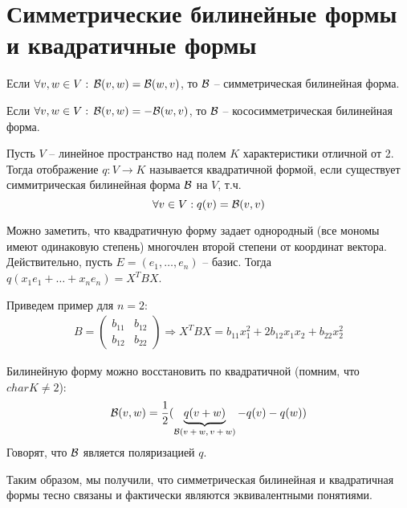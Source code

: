 \section{Симметрические билинейные формы и квадратичные формы}
\begin{conj}
    Если $\forall v, w \in V: \, \mathcal{B}(v, w) = \mathcal{B}(w, v)$, то 
    $\mathcal{B}$ -- симметрическая билинейная форма.
\end{conj}

\begin{conj}
    Если $\forall v, w \in V: \, \mathcal{B}(v, w) = -\mathcal{B}(w, v)$, то 
    $\mathcal{B}$ -- кососимметрическая билинейная форма.
\end{conj}

\begin{conj}
    Пусть $V$ -- линейное пространство над полем $K$ характеристики отличной от 2.
    Тогда отображение $q: V \to K$ называется квадратичной формой,
    если существует симмитрическая билинейная форма $\mathcal{B}$ на $V$, т.ч.
    \[ \forall v \in V: q(v) = \mathcal{B}(v, v) \]
\end{conj}

Можно заметить, что квадратичную форму задает однородный (все мономы имеют одинаковую степень) многочлен второй степени от координат вектора.
Действительно, пусть $E = (e_1, \dots, e_n)$ -- базис.
Тогда $q(x_1e_1 + \dots + x_ne_n) = X^TBX$.

Приведем пример для $n = 2$: \begin{gather*}
    B = \left(\begin{array}{cc}
        b_{11} & b_{12} \\ 
        b_{12} & b_{22}
        \end{array}\right) \Rightarrow X^TBX = b_{11}x^2_1 + 2b_{12}x_1x_2 + b_{22}x^2_2
\end{gather*}

Билинейную форму можно восстановить по квадратичной (помним, что $char K \neq 2$):
$$
    \mathcal{B}(v, w) = \frac{1}{2}(
        \underbrace{q(v + w)}_{\text{$\mathcal{B}(v + w, v + w)$}} - q(v) - q(w)
        )
$$
Говорят, что $\mathcal{B}$ является поляризацией $q$.

Таким образом, мы получили, что симметрическая билинейная и квадратичная формы тесно связаны и фактически являются эквивалентными понятиями.
